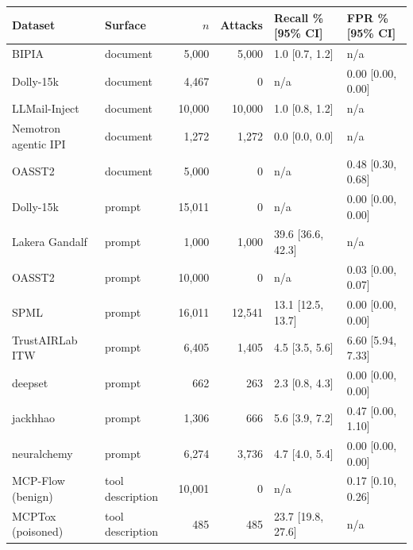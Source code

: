 \begin{tabular}{llrrll}
\toprule
Dataset & Surface & $n$ & Attacks & Recall \% [95\% CI] & FPR \% [95\% CI] \\
\midrule
BIPIA & document & 5,000 & 5,000 & 1.0 [0.7, 1.2] & n/a \\
Dolly-15k & document & 4,467 & 0 & n/a & 0.00 [0.00, 0.00] \\
LLMail-Inject & document & 10,000 & 10,000 & 1.0 [0.8, 1.2] & n/a \\
Nemotron agentic IPI & document & 1,272 & 1,272 & 0.0 [0.0, 0.0] & n/a \\
OASST2 & document & 5,000 & 0 & n/a & 0.48 [0.30, 0.68] \\
Dolly-15k & prompt & 15,011 & 0 & n/a & 0.00 [0.00, 0.00] \\
Lakera Gandalf & prompt & 1,000 & 1,000 & 39.6 [36.6, 42.3] & n/a \\
OASST2 & prompt & 10,000 & 0 & n/a & 0.03 [0.00, 0.07] \\
SPML & prompt & 16,011 & 12,541 & 13.1 [12.5, 13.7] & 0.00 [0.00, 0.00] \\
TrustAIRLab ITW & prompt & 6,405 & 1,405 & 4.5 [3.5, 5.6] & 6.60 [5.94, 7.33] \\
deepset & prompt & 662 & 263 & 2.3 [0.8, 4.3] & 0.00 [0.00, 0.00] \\
jackhhao & prompt & 1,306 & 666 & 5.6 [3.9, 7.2] & 0.47 [0.00, 1.10] \\
neuralchemy & prompt & 6,274 & 3,736 & 4.7 [4.0, 5.4] & 0.00 [0.00, 0.00] \\
MCP-Flow (benign) & tool description & 10,001 & 0 & n/a & 0.17 [0.10, 0.26] \\
MCPTox (poisoned) & tool description & 485 & 485 & 23.7 [19.8, 27.6] & n/a \\
\bottomrule
\end{tabular}
